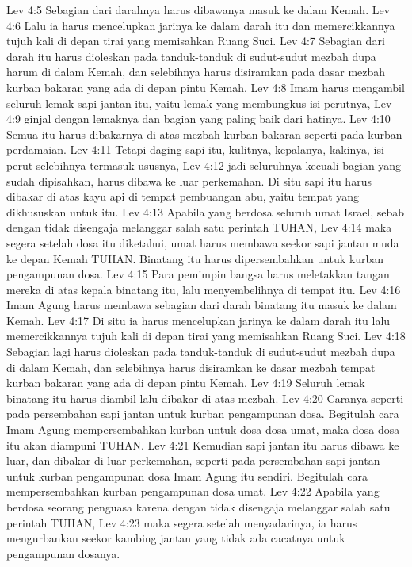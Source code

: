 Lev 4:5  Sebagian dari darahnya harus dibawanya masuk ke dalam Kemah.
Lev 4:6  Lalu ia harus mencelupkan jarinya ke dalam darah itu dan memercikkannya tujuh kali di depan tirai yang memisahkan Ruang Suci.
Lev 4:7  Sebagian dari darah itu harus dioleskan pada tanduk-tanduk di sudut-sudut mezbah dupa harum di dalam Kemah, dan selebihnya harus disiramkan pada dasar mezbah kurban bakaran yang ada di depan pintu Kemah.
Lev 4:8  Imam harus mengambil seluruh lemak sapi jantan itu, yaitu lemak yang membungkus isi perutnya,
Lev 4:9  ginjal dengan lemaknya dan bagian yang paling baik dari hatinya.
Lev 4:10  Semua itu harus dibakarnya di atas mezbah kurban bakaran seperti pada kurban perdamaian.
Lev 4:11  Tetapi daging sapi itu, kulitnya, kepalanya, kakinya, isi perut selebihnya termasuk ususnya,
Lev 4:12  jadi seluruhnya kecuali bagian yang sudah dipisahkan, harus dibawa ke luar perkemahan. Di situ sapi itu harus dibakar di atas kayu api di tempat pembuangan abu, yaitu tempat yang dikhususkan untuk itu.
Lev 4:13  Apabila yang berdosa seluruh umat Israel, sebab dengan tidak disengaja melanggar salah satu perintah TUHAN,
Lev 4:14  maka segera setelah dosa itu diketahui, umat harus membawa seekor sapi jantan muda ke depan Kemah TUHAN. Binatang itu harus dipersembahkan untuk kurban pengampunan dosa.
Lev 4:15  Para pemimpin bangsa harus meletakkan tangan mereka di atas kepala binatang itu, lalu menyembelihnya di tempat itu.
Lev 4:16  Imam Agung harus membawa sebagian dari darah binatang itu masuk ke dalam Kemah.
Lev 4:17  Di situ ia harus mencelupkan jarinya ke dalam darah itu lalu memercikkannya tujuh kali di depan tirai yang memisahkan Ruang Suci.
Lev 4:18  Sebagian lagi harus dioleskan pada tanduk-tanduk di sudut-sudut mezbah dupa di dalam Kemah, dan selebihnya harus disiramkan ke dasar mezbah tempat kurban bakaran yang ada di depan pintu Kemah.
Lev 4:19  Seluruh lemak binatang itu harus diambil lalu dibakar di atas mezbah.
Lev 4:20  Caranya seperti pada persembahan sapi jantan untuk kurban pengampunan dosa. Begitulah cara Imam Agung mempersembahkan kurban untuk dosa-dosa umat, maka dosa-dosa itu akan diampuni TUHAN.
Lev 4:21  Kemudian sapi jantan itu harus dibawa ke luar, dan dibakar di luar perkemahan, seperti pada persembahan sapi jantan untuk kurban pengampunan dosa Imam Agung itu sendiri. Begitulah cara mempersembahkan kurban pengampunan dosa umat.
Lev 4:22  Apabila yang berdosa seorang penguasa karena dengan tidak disengaja melanggar salah satu perintah TUHAN,
Lev 4:23  maka segera setelah menyadarinya, ia harus mengurbankan seekor kambing jantan yang tidak ada cacatnya untuk pengampunan dosanya.
